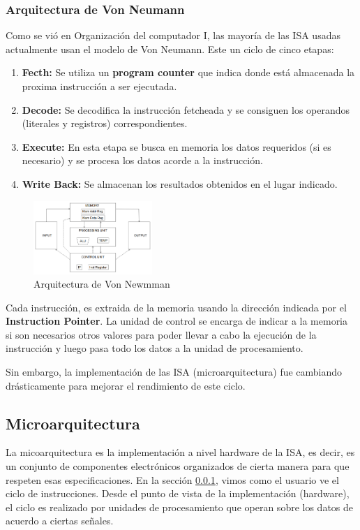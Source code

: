 \subsubsection{Arquitectura de Von Neumann}\label{sec::Intro::ISA::Von_Neuman}
Como se vió en Organización del computador I, las mayoría de las ISA usadas actualmente usan el modelo de Von Neumann. Este un ciclo de cinco etapas: 

\begin{enumerate}
	\item \textbf{Fecth:} Se utiliza un \textbf{program counter} que indica donde está almacenada la proxima instrucción a ser ejecutada.
	\item \textbf{Decode:} Se decodifica la instrucción fetcheada y se consiguen los operandos (literales y registros) correspondientes.
	\item \textbf{Execute:} En esta etapa se busca en memoria los datos requeridos (si es necesario) y se procesa los datos acorde a la instrucción.
	\item \textbf{Write Back:} Se almacenan los resultados obtenidos en el lugar indicado.
\end{enumerate}

\begin{figure}[h]
	\centering
	\includegraphics[width=0.4\textwidth]{imagenes/von-neuman-arquichtecture}
	\caption{Arquitectura de Von Newmman}
	\label{fig:intro:componentesIsa::vonsneumanarquichtecture}
\end{figure}
Cada instrucción, es extraida de la memoria usando la dirección indicada por el \textbf{Instruction Pointer}. La unidad de control se encarga de indicar a la memoria si son necesarios otros valores para poder llevar a cabo la ejecución de la instrucción y luego pasa todo los datos a la unidad de procesamiento.

Sin embargo, la implementación de las ISA (microarquitectura) fue cambiando drásticamente para mejorar el rendimiento de este ciclo.

\subsection{Microarquitectura}
La micoarquitectura es la implementación a nivel hardware de la ISA, es decir, es un conjunto de componentes electrónicos organizados de cierta manera para que respeten esas especificaciones. En la sección \ref{sec::Intro::ISA::Von_Neuman}, vimos como el usuario ve el ciclo de instrucciones. Desde el punto de vista de la implementación (hardware), el ciclo es realizado por unidades de procesamiento que operan sobre los datos de acuerdo a ciertas señales. 

